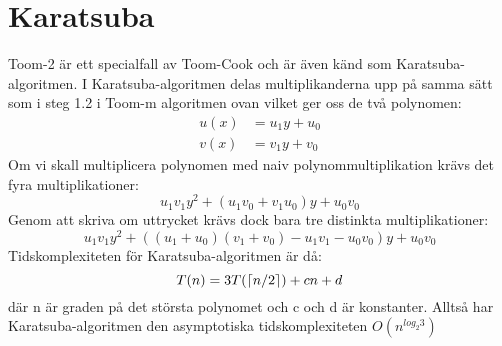 \section{Karatsuba}
Toom-2 är ett specialfall av Toom-Cook och är även känd som
Karatsuba-algoritmen. I Karatsuba-algoritmen delas multiplikanderna upp på
samma sätt som i steg 1.2 i Toom-m algoritmen ovan vilket ger oss de två
polynomen:
\begin{align*}
  u(x) &= u_1 y + u_0 \\
  v(x) &= v_1 y + v_0
\end{align*}
Om vi skall multiplicera polynomen med naiv polynommultiplikation krävs det
fyra multiplikationer:
\begin{equation*}
  u_1 v_1 y^2 + (u_1 v_0+v_1 u_0) y + u_0 v_0
\end{equation*}
Genom att skriva om uttrycket krävs dock bara tre distinkta multiplikationer:
\begin{equation*}
  u_1 v_1 y^2 + ((u_1 + u_0)(v_1 + v_0) - u_1 v_1 - u_0 v_0) y + u_0 v_0
\end{equation*}
Tidskomplexiteten för Karatsuba-algoritmen är då:
\begin{equation*}
  T(n) = 3 T(\lceil n/2\rceil) + cn + d
\end{equation*}
där n är graden på det största polynomet och c och d är konstanter. Alltså har
Karatsuba-algoritmen den asymptotiska tidskomplexiteten $O(n^{log_2 3})$
